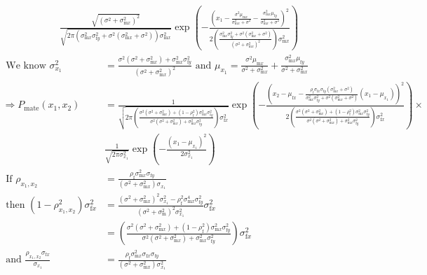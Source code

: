 \documentclass{article}
\newcommand{\x}[1]{\text{#1}}
\begin{document}
\begin{align*}
\\&\frac{\sqrt{(\sigma^2+\sigma_{\x{m}x}^2)^2}}{\sqrt{2\pi(\sigma_{\x{m}x}^2\sigma_{\x{f}y}^2+\sigma^2(\sigma_{\x{m}x}^2+\sigma^2))\sigma_{\x{m}x}^2}}\exp\left(-\frac{\left(x_1-\frac{\sigma^2\mu_{\x{m}x}}{\sigma_{\x{m}x}^2+\sigma^2}-\frac{\sigma_{\x{m}x}^2\mu_{\x{f}y}}{\sigma_{\x{m}x}^2+\sigma^2}\right)^2}{2\left(\frac{\sigma_{\x{m}x}^2\sigma_{\x{f}y}^2+\sigma^2(\sigma_{\x{m}x}^2+\sigma^2)}{(\sigma^2+\sigma_{\x{m}x}^2)^2}\right)\sigma_{\x{m}x}^2}\right)
\end{align*}
\begin{align*}
\text{ We know } \sigma_{x_1}^2&=\frac{\sigma^2(\sigma^2+\sigma_{\x{m}x}^2)+\sigma_{\x{m}x}^2\sigma_{\x{f}y}^2}{(\sigma^2+\sigma_{\x{m}x}^2)^2} \text{ and } \mu_{x_1}=\frac{\sigma^2\mu_{\x{m}x}}{\sigma^2+\sigma_{\x{m}x}^2}+\frac{\sigma_{\x{m}x}^2\mu_{\x{f}y}}{\sigma^2+\sigma_{\x{m}x}^2}
\\\Rightarrow P_\text{mate}(x_1,x_2)&=\frac{1}{\sqrt{2\pi \left(\frac{\sigma^2(\sigma^2+\sigma_{\x{m}x}^2)+(1-\rho_\x{f}^2)\sigma_{\x{m}x}^2\sigma_{\x{f}y}^2}{\sigma^2(\sigma^2+\sigma_{\x{m}x}^2)+\sigma_{\x{m}x}^2\sigma_{\x{f}y}^2}\right)\sigma_{\x{f}x}^2}}\exp\left(-\frac{\left(x_2-\mu_{\x{f}x}-\frac{\rho_\x{f}\sigma_{\x{f}x}\sigma_{\x{f}y}(\sigma_{\x{m}x}^2+\sigma^2)}{\sigma_{\x{m}x}^2\sigma_{\x{f}y}^2+\sigma^2(\sigma_{\x{m}x}^2+\sigma^2)}\left(x_1-\mu_{x_1}\right)\right)^2}{2\left(\frac{\sigma^2(\sigma^2+\sigma_{\x{m}x}^2)+(1-\rho_\x{f}^2)\sigma_{\x{m}x}^2\sigma_{\x{f}y}^2}{\sigma^2(\sigma^2+\sigma_{\x{m}x}^2)+\sigma_{\x{m}x}^2\sigma_{\x{f}y}^2}\right)\sigma_{\x{f}x}^2}\right)\times
\\&\frac{1}{\sqrt{2\pi\sigma_{x_1}^2}}\exp\left(-\frac{\left(x_1-\mu_{x_1}\right)^2}{2\sigma_{x_1}^2}\right)
\\ \text{ If } \rho_{x_1,x_2}&=\frac{\rho_\x{f}\sigma_{\x{m}x}^2\sigma_{\x{f}y}}{(\sigma^2+\sigma_{\x{m}x}^2)\sigma_{x_1}}
\\ \text{ then } (1-\rho_{x_1,x_2}^2)\sigma_{\x{f}x}^2&=\frac{(\sigma^2+\sigma_{\x{m}x}^2)^2\sigma_{x_1}^2-\rho_\x{f}^2\sigma_{\x{m}x}^4\sigma_{\x{f}y}^2}{(\sigma^2+\sigma_{\x{m}}^2)^2\sigma_{x_1}^2}\sigma_{\x{f}x}^2
\\&=\left(\frac{\sigma^2(\sigma^2+\sigma_{\x{m}x}^2)+(1-\rho_\x{f}^2)\sigma_{\x{m}x}^2\sigma_{\x{f}y}^2}{\sigma^2(\sigma^2+\sigma_{\x{m}x}^2)+\sigma_{\x{m}x}^2\sigma_{\x{f}y}^2}\right)\sigma_{\x{f}x}^2
\\ \text{ and } \frac{\rho_{x_1,x_2}\sigma_{\x{f}x}}{\sigma_{x_1}}&=\frac{\rho_\x{f}\sigma_{\x{m}x}^2\sigma_{\x{f}x}\sigma_{\x{f}y}}{(\sigma^2+\sigma_{\x{m}x}^2)\sigma_{x_1}^2}

\end{align*}
\end{document}

